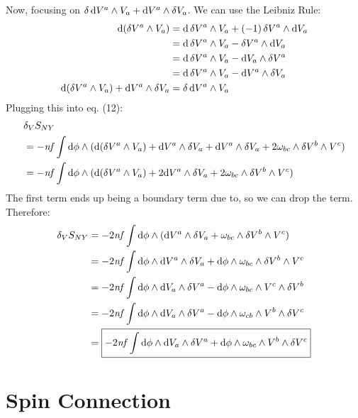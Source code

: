 \documentclass[12pt]{article}
\begin{document}
Now, focusing on $\var{\dd{V^a}} \wedge V_a + \dd V^a \wedge \var{V_a}$. We can use the Leibniz Rule:
\begin{align*}
  \dd(\var{V^a} \wedge V_a) &= \dd{\var{V^a}} \wedge V_a + (-1)\var{V^a} \wedge \dd{V_a} \\
  &= \dd{\var{V^a}} \wedge V_a - \var{V^a} \wedge \dd{V_a} \\
  &= \dd{\var{V^a}} \wedge V_a - \dd{V_a} \wedge \var{V^a} \\
  &= \dd{\var{V^a}} \wedge V_a - \dd{V^a} \wedge \var{V_a} \\
  \dd(\var{V^a} \wedge V_a) + \dd{V^a} \wedge \var{V_a} &= \var{\dd{V^a}} \wedge V_a
\end{align*}
Plugging this into eq. (12):
\begin{align*}
  &\var_V{S_{NY}} \\ &= -\mathit{nf}\int \dd\phi \wedge (\dd(\var{V^a} \wedge V_a) + \dd{V^a} \wedge \var{V_a} + \dd V^a \wedge \var{V_a} + 2\omega_{bc} \wedge \var{V^b} \wedge V^c) \\
  &= -\mathit{nf}\int \dd\phi \wedge (\dd(\var{V^a} \wedge V_a) + 2\dd V^a \wedge \var{V_a} + 2\omega_{bc} \wedge \var{V^b} \wedge V^c)
\end{align*}
The first term ends up being a boundary term due to, so we can drop the term. Therefore:
\begin{align}
  \var_V{S_{NY}} &= -2\mathit{nf}\int \dd\phi \wedge (\dd V^a \wedge \var{V_a} + \omega_{bc} \wedge \var{V^b} \wedge V^c) \nonumber \\
  &= -2\mathit{nf} \int \dd\phi \wedge \dd V^a \wedge \var{V_a} + \dd\phi \wedge \omega_{bc} \wedge \var{V^b} \wedge V^c \nonumber \\
  &= -2\mathit{nf} \int \dd\phi \wedge \dd V_a \wedge \var{V^a} - \dd\phi \wedge \omega_{bc} \wedge V^c \wedge \var{V^b} \nonumber \\
  &= -2\mathit{nf} \int \dd\phi \wedge \dd V_a \wedge \var{V^a} - \dd\phi \wedge \omega_{cb} \wedge V^b \wedge \var{V^c} \nonumber \\
  &= \boxed{-2\mathit{nf} \int \dd\phi \wedge \dd V_a \wedge \var{V^a} + \dd\phi \wedge \omega_{bc} \wedge V^b \wedge \var{V^c}}
\end{align}

\section{Spin Connection}
\end{document}
